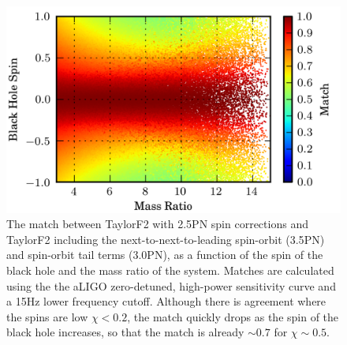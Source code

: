 \begin{figure}
\begin{center}
\includegraphics[width=1.0	\textwidth]{papers/nsbh_faithfulness/figure4.png}
\end{center}
\caption{\label{fig:5715f2f2}The match between TaylorF2 with 2.5\ac{PN} spin corrections
and TaylorF2 including the next-to-next-to-leading spin-orbit (3.5\ac{PN}) and spin-orbit tail 
terms (3.0\ac{PN}), as a function of the spin of the black hole
and the mass ratio of the system. Matches are calculated using the the aLIGO
zero-detuned, high-power sensitivity curve and a 15Hz lower frequency cutoff. Although 
there is agreement where the spins are low $\chi < 0.2 $, the match quickly drops
as the spin of the black hole increases, so that the match is already $ \sim 0.7 $ for $\chi \sim 0.5$.
}
\end{figure}

